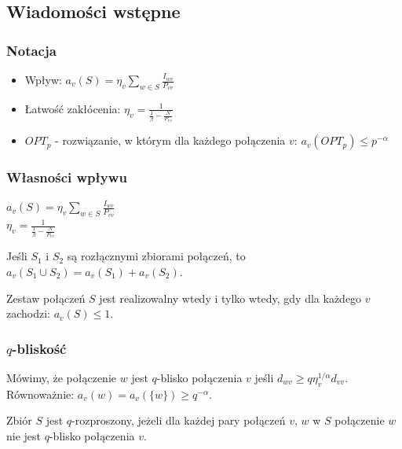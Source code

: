 \documentclass[polish, t,10pt]{beamer}
\begin{document}
\subsection{Wiadomości wstępne}
\begin{frame}
    \frametitle{Notacja}
    \begin{itemize}
        \item Wpływ: $a_v(S) = \eta_v \sum_{w \in S} \frac{I_{wv}}{P_{vv}}$
        \item Łatwość zakłócenia: $\eta_v = \frac{1}{\frac{1}{\beta} - \frac{N}{P_{vv}}}$
        \item $OPT_p$ - rozwiązanie, w którym dla każdego połączenia $v$: $a_v(OPT_p) \le p^{-\alpha}$
    \end{itemize}
\end{frame}

\begin{frame}
    \frametitle{Własności wpływu}
    \begin{definition}
        $a_v(S) = \eta_v \sum_{w \in S} \frac{I_{wv}}{P_{vv}}$\\
        $\eta_v = \frac{1}{\frac{1}{\beta} - \frac{N}{P_{vv}}}$
    \end{definition}
    \begin{lemma}
        Jeśli $S_1$ i $S_2$ są rozłącznymi zbiorami połączeń, to $a_v(S_1 \cup S_2) = a_v(S_1) + a_v(S_2)$.
    \end{lemma}
    \begin{lemma}
        Zestaw połączeń $S$ jest realizowalny wtedy i tylko wtedy, gdy dla każdego $v$ zachodzi:
        $a_v(S) \le 1$.
    \end{lemma}
\end{frame}

\begin{frame}
    \frametitle{$q$-bliskość}
    \begin{definition}
        Mówimy, że połączenie $w$ jest $q$-blisko połączenia $v$ jeśli $d_{wv} \ge q \eta_v^{1/\alpha} d_{vv}$.
        Równoważnie: $a_v(w) = a_v(\{w\}) \ge q^{-\alpha}$.
    \end{definition}

    \begin{definition}
        Zbiór $S$ jest $q$-rozproszony, jeżeli dla każdej pary połączeń $v$, $w$ w $S$ połączenie $w$ nie jest $q$-blisko połączenia $v$.
    \end{definition}
\end{frame}
\end{document}
